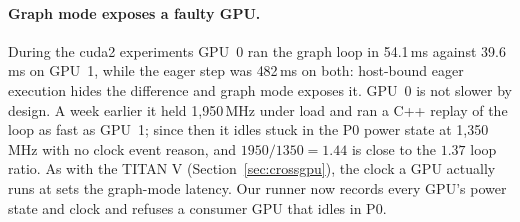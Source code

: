 \paragraph{Graph mode exposes a faulty GPU.} During the cuda2 experiments GPU~0 ran the graph
loop in 54.1\,ms against 39.6\,ms on GPU~1, while the eager step was 482\,ms on both:
host-bound eager execution hides the difference and graph mode exposes it. GPU~0 is not slower
by design. A week earlier it held 1,950\,MHz under load and ran a C++ replay of the loop as
fast as GPU~1; since then it idles stuck in the P0 power state at 1,350\,MHz with no clock
event reason, and $1950/1350 = 1.44$ is close to the $1.37$ loop ratio. As with the TITAN V
(Section~\ref{sec:crossgpu}), the clock a GPU actually runs at sets the graph-mode latency.
Our runner now records every GPU's power state and clock and refuses a consumer GPU that idles
in P0.
